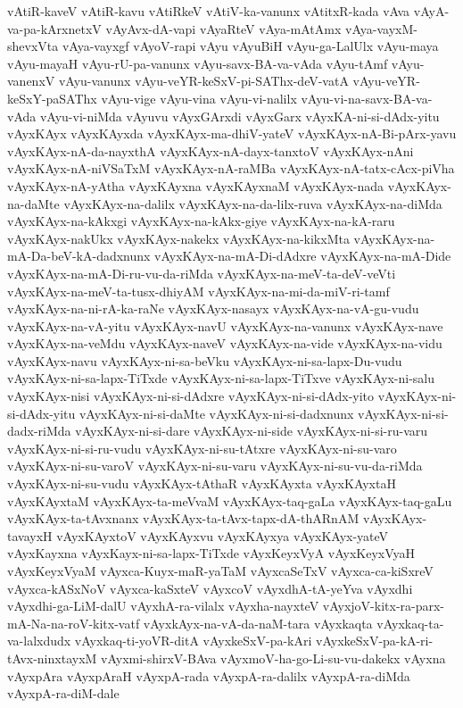 {vAtiR-kaveV
vAtiR-kavu
vAtiRkeV
vAtiV-ka-vanunx
vAtitxR-kada
vAva
vAyA-va-pa-kArxnetxV
vAyAvx-dA-vapi
vAyaRteV
vAya-mAtAmx
vAya-vayxM-shevxVta
vAya-vayxgf
vAyoV-rapi
vAyu
vAyuBiH
vAyu-ga-LalUlx
vAyu-maya
vAyu-mayaH
vAyu-rU-pa-vanunx
vAyu-savx-BA-va-vAda
vAyu-tAmf
vAyu-vanenxV
vAyu-vanunx
vAyu-veYR-keSxV-pi-SAThx-deV-vatA
vAyu-veYR-keSxY-paSAThx
vAyu-vige
vAyu-vina
vAyu-vi-nalilx
vAyu-vi-na-savx-BA-va-vAda
vAyu-vi-niMda
vAyuvu
vAyxGArxdi
vAyxGarx
vAyxKA-ni-si-dAdx-yitu
vAyxKAyx
vAyxKAyxda
vAyxKAyx-ma-dhiV-yateV
vAyxKAyx-nA-Bi-pArx-yavu
vAyxKAyx-nA-da-nayxthA
vAyxKAyx-nA-dayx-tanxtoV
vAyxKAyx-nAni
vAyxKAyx-nA-niVSaTxM
vAyxKAyx-nA-raMBa
vAyxKAyx-nA-tatx-cAcx-piVha
vAyxKAyx-nA-yAtha
vAyxKAyxna
vAyxKAyxnaM
vAyxKAyx-nada
vAyxKAyx-na-daMte
vAyxKAyx-na-dalilx
vAyxKAyx-na-da-lilx-ruva
vAyxKAyx-na-diMda
vAyxKAyx-na-kAkxgi
vAyxKAyx-na-kAkx-giye
vAyxKAyx-na-kA-raru
vAyxKAyx-nakUkx
vAyxKAyx-nakekx
vAyxKAyx-na-kikxMta
vAyxKAyx-na-mA-Da-beV-kA-dadxnunx
vAyxKAyx-na-mA-Di-dAdxre
vAyxKAyx-na-mA-Dide
vAyxKAyx-na-mA-Di-ru-vu-da-riMda
vAyxKAyx-na-meV-ta-deV-veVti
vAyxKAyx-na-meV-ta-tusx-dhiyAM
vAyxKAyx-na-mi-da-miV-ri-tamf
vAyxKAyx-na-ni-rA-ka-raNe
vAyxKAyx-nasayx
vAyxKAyx-na-vA-gu-vudu
vAyxKAyx-na-vA-yitu
vAyxKAyx-navU
vAyxKAyx-na-vanunx
vAyxKAyx-nave
vAyxKAyx-na-veMdu
vAyxKAyx-naveV
vAyxKAyx-na-vide
vAyxKAyx-na-vidu
vAyxKAyx-navu
vAyxKAyx-ni-sa-beVku
vAyxKAyx-ni-sa-lapx-Du-vudu
vAyxKAyx-ni-sa-lapx-TiTxde
vAyxKAyx-ni-sa-lapx-TiTxve
vAyxKAyx-ni-salu
vAyxKAyx-nisi
vAyxKAyx-ni-si-dAdxre
vAyxKAyx-ni-si-dAdx-yito
vAyxKAyx-ni-si-dAdx-yitu
vAyxKAyx-ni-si-daMte
vAyxKAyx-ni-si-dadxnunx
vAyxKAyx-ni-si-dadx-riMda
vAyxKAyx-ni-si-dare
vAyxKAyx-ni-side
vAyxKAyx-ni-si-ru-varu
vAyxKAyx-ni-si-ru-vudu
vAyxKAyx-ni-su-tAtxre
vAyxKAyx-ni-su-varo
vAyxKAyx-ni-su-varoV
vAyxKAyx-ni-su-varu
vAyxKAyx-ni-su-vu-da-riMda
vAyxKAyx-ni-su-vudu
vAyxKAyx-tAthaR
vAyxKAyxta
vAyxKAyxtaH
vAyxKAyxtaM
vAyxKAyx-ta-meVvaM
vAyxKAyx-taq-gaLa
vAyxKAyx-taq-gaLu
vAyxKAyx-ta-tAvxnanx
vAyxKAyx-ta-tAvx-tapx-dA-thARnAM
vAyxKAyx-tavayxH
vAyxKAyxtoV
vAyxKAyxvu
vAyxKAyxya
vAyxKAyx-yateV
vAyxKayxna
vAyxKayx-ni-sa-lapx-TiTxde
vAyxKeyxVyA
vAyxKeyxVyaH
vAyxKeyxVyaM
vAyxca-Kuyx-maR-yaTaM
vAyxcaSeTxV
vAyxca-ca-kiSxreV
vAyxca-kASxNoV
vAyxca-kaSxteV
vAyxcoV
vAyxdhA-tA-yeYva
vAyxdhi
vAyxdhi-ga-LiM-dalU
vAyxhA-ra-vilalx
vAyxha-nayxteV
vAyxjoV-kitx-ra-parx-mA-Na-na-roV-kitx-vatf
vAyxkAyx-na-vA-da-naM-tara
vAyxkaqta
vAyxkaq-ta-va-lalxdudx
vAyxkaq-ti-yoVR-ditA
vAyxkeSxV-pa-kAri
vAyxkeSxV-pa-kA-ri-tAvx-ninxtayxM
vAyxmi-shirxV-BAva
vAyxmoV-ha-go-Li-su-vu-dakekx
vAyxna
vAyxpAra
vAyxpAraH
vAyxpA-rada
vAyxpA-ra-dalilx
vAyxpA-ra-diMda
vAyxpA-ra-diM-dale
}

